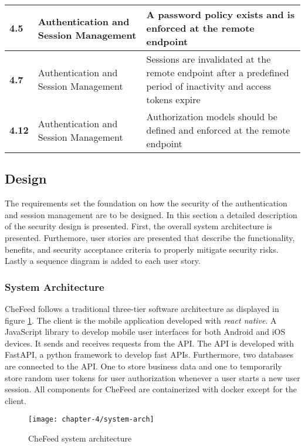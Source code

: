\begin{table}
\begin{tabulary}{0.5\textwidth}{|l|L|L|}
        \hline
        \textbf{4.5} & Authentication and Session Management & A password policy exists and is enforced at the remote endpoint \\
        \hline
        \textbf{4.7} & Authentication and Session Management & Sessions are invalidated at the remote endpoint after a predefined period of inactivity and access tokens expire \\
        \hline
        \textbf{4.12} & Authentication and Session Management & Authorization models should be defined and enforced at the remote endpoint \\
        \hline
    \end{tabulary}
\end{table}

\subsection{Design}\label{sec-4:design}
The requirements set the foundation on how the security of the authentication and session management are to be designed. In this section a detailed description of the security design is presented. First, the overall system architecture is presented. Furthemore, user stories are presented that describe the functionality, benefits, and security acceptance criteria to properly mitigate security risks. Lastly a sequence diagram is added to each user story.

\subsubsection{System Architecture}
CheFeed follows a traditional three-tier software architecture as displayed in figure \ref{fig:sys-arch}. The client is the mobile application developed with \textit{react native}. A JavaScript library to develop mobile user interfaces for both Android and iOS devices. It sends and receives requests from the API. The API is developed with FastAPI, a python framework to develop fast APIs. Furthermore, two databases are connected to the API. One to store business data and one to temporarily store random user tokens for user authorization whenever a user starts a new user session. All components for CheFeed are containerized with docker except for the client.

\begin{figure}
    \caption{CheFeed system architecture}
    \label{fig:sys-arch}
    \texttt{[image: chapter-4/system-arch]}
\end{figure}

